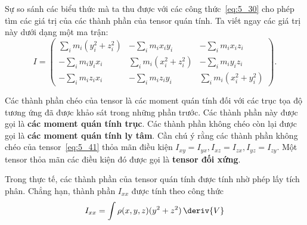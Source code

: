 Sự so sánh các biểu thức mà ta thu được với các công thức~\eqref{eq:5_30} cho phép tìm các giá trị của các thành phần của tensor quán tính. Ta viết ngay các giá trị này dưới dạng một ma trận:
\begin{equation}\label{eq:5_41}
	I = \begin{pmatrix}
		\displaystyle\sum_i m_i(y_i^2+z_i^2) & -\displaystyle\sum_i m_i x_i y_i & -\displaystyle\sum_i m_i x_i z_i\\
		-\displaystyle\sum_i m_i y_i x_i & \displaystyle\sum_i m_i (x_i^2+z_i^2) & -\displaystyle\sum_i m_i y_i z_i\\
		-\displaystyle\sum_i m_i z_i x_i & -\displaystyle\sum_i m_i z_i y_i & \displaystyle\sum_i m_i (x_i^2+y_i^2)
	\end{pmatrix}.
\end{equation}

\noindent
Các thành phần chéo của tensor là các moment quán tính đối với các trục tọa độ tương ứng đã được khảo sát trong những phần trước. Các thành phần này được gọi là \textbf{các moment quán tính trục}. Các thành phần không chéo còn lại được gọi là \textbf{các moment quán tính ly tâm}. Cần chú ý rằng các thành phần không chéo của tensor~\eqref{eq:5_41} thỏa mãn điều kiện $I_{xy}=I_{yx}, I_{xz}=I_{zx}, I_{yz}=I_{zy}$. Một tensor thỏa mãn các điều kiện đó được gọi là \textbf{tensor đối xứng}.

Trong thực tế, các thành phần của tensor quán tính được tính nhờ phép lấy tích phân. Chẳng hạn, thành phần $I_{xx}$ được tính theo công thức
\begin{equation*}
	I_{xx} = \int \rho(x,y,z)(y^2+z^2)\,\deriv{V}
\end{equation*}

